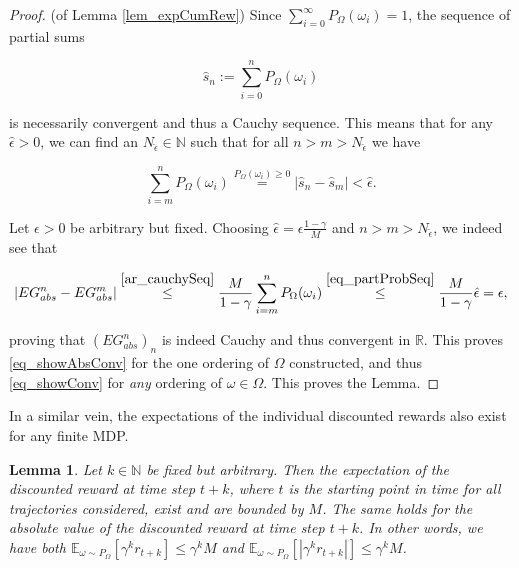\documentclass[11pt]{article} %
\newtheorem{lem}{Lemma}
\begin{document}
\begin{proof}{(of Lemma \ref{lem_expCumRew})}
Since $\sum_{i=0}^{\infty} P_{\Omega}(\omega_i) = 1$, the sequence of partial sums

\begin{equation}
	\hat{s}_n := \sum_{i=0}^n P_{\Omega}(\omega_i)
\end{equation}

is necessarily convergent and thus a Cauchy sequence. This means that for any $\hat{\epsilon} > 0$, we can find an $N_{\hat{\epsilon}} \in \mathbb{N}$ such that for all $n>m>N_{\hat{\epsilon}}$ we have 

\begin{equation}\label{eq_partProbSeq}
	\sum_{i=m}^n  P_{\Omega}(\omega_i) \overset{P_{\Omega}(\omega_i) \ge 0}{=} |\hat{s}_n - \hat{s}_m| < \hat{\epsilon}.
\end{equation}

Let $\epsilon >0$ be arbitrary but fixed. Choosing $\hat{\epsilon} = \epsilon \frac{1 - \gamma}{M}$ and $n>m>N_{\hat{\epsilon}}$, we indeed see that

\begin{equation}
	| EG_{abs}^n - EG_{abs}^m | \overset{\ref{ar_cauchySeq}}{\le} \frac{M}{1- \gamma} \sum_{i=m}^n P_{\Omega}(\omega_i) \overset{\ref{eq_partProbSeq}}{\le} \frac{M}{1 - \gamma} \hat{\epsilon} = \epsilon,
\end{equation}

proving that $(EG_{abs}^n)_n$ is indeed Cauchy and thus convergent in $\mathbb{R}$. This proves \ref{eq_showAbsConv} for the one ordering of $\Omega$ constructed, and thus \ref{eq_showConv} for \textit{any} ordering of $\omega \in \Omega$. This proves the Lemma.

\end{proof}

In a similar vein, the expectations of the individual discounted rewards also exist for any finite MDP.

\begin{lem}\label{lem_expIndRew}
	Let $k \in \mathbb{N}$ be fixed but arbitrary. Then the expectation of the discounted reward at time step $t+k$, where $t$ is the starting point in time for all trajectories considered, exist and are bounded by $M$. The same holds for the absolute value of the discounted reward at time step $t+k$. In other words, we have both $\mathbb{E}_{\omega \sim P_\Omega}[\gamma^k r_{t+k}] \le \gamma^k M$ and $\mathbb{E}_{\omega \sim P_\Omega}[|\gamma^k r_{t+k}|] \le \gamma^k M$.
\end{lem}
\end{document}
